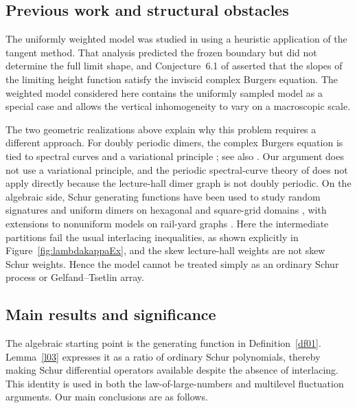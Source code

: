 \documentclass[11pt]{amsart}
\newenvironment{introrevision}{\begingroup\color{black}}{\endgroup}
\theoremstyle{plain}
\numberwithin{equation}{section}
\numberwithin{theorem}{section}
\numberwithin{figure}{section}
\begin{document}
\begin{introrevision}
\subsection*{Previous work and structural obstacles}

The uniformly weighted model was studied in \cite{SKN21} using a
heuristic application of the tangent method. That analysis predicted
the frozen boundary but did not determine the full limit shape, and
Conjecture~6.1 of \cite{SKN21} asserted that the slopes of the limiting
height function satisfy the inviscid complex Burgers equation. The
weighted model considered here contains the uniformly sampled model
as a special case and allows the vertical inhomogeneity to vary on a
macroscopic scale.

The two geometric realizations above explain why this problem requires
a different approach. For doubly periodic dimers, the complex Burgers
equation is tied to spectral curves and a variational principle
\cite{ko07}; see also \cite{ADPZ23}. Our argument does not use a
variational principle, and the periodic spectral-curve theory of
\cite{ko07} does not apply directly because the lecture-hall dimer
graph is not doubly periodic. On the algebraic side, Schur generating
functions have been used to study random signatures and uniform dimers
on hexagonal and square-grid domains \cite{bg,bg16,bk}, with extensions
to nonuniform models on rail-yard graphs
\cite{BL17,ZL18,ZL201,ZL20,Li21}. Here the intermediate partitions fail
the usual interlacing inequalities, as shown explicitly in
Figure~\ref{fig:lambdakappaEx}, and the skew lecture-hall weights are
not skew Schur weights. Hence the model cannot be treated simply as an
ordinary Schur process or Gelfand--Tsetlin array.

\subsection*{Main results and significance}

The algebraic starting point is the generating function in
Definition~\ref{df01}. Lemma~\ref{l03} expresses it as a ratio of
ordinary Schur polynomials, thereby making Schur differential
operators available despite the absence of interlacing. This identity
is used in both the law-of-large-numbers and multilevel fluctuation
arguments. Our main conclusions are as follows.

\begin{enumerate}[label=\textup{(\roman*)},leftmargin=*]


\end{enumerate}
\end{introrevision}
\end{document}

